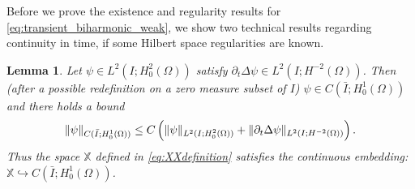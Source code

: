 \documentclass{m2an}
\newcommand{\1}{\mathds{1}}
\newcommand{\Om}{\Omega}
\DeclarePairedDelimiter{\norm}{\lVert}{\rVert}
\newcommand{\XX}{\mathbb{X}}
\newtheorem{lemma}[theorem]{Lemma}
\theoremstyle{definition}
\begin{document}
Before we prove the existence and regularity results for \eqref{eq:transient_biharmonic_weak}, we 
    show two technical results regarding continuity in time, if some Hilbert space regularities are known.
\begin{lemma}\label{lemm:H1_continuity}
    Let $\psi \in L^2(I;H^2_0(\Om))$ satisfy $\partial_t \Delta \psi \in L^2(I;H^{-2}(\Om))$.
    Then (after a possible redefinition on a zero measure subset of $I$)
    $\psi \in C(\bar I;H^1_0(\Om))$ and there holds a bound
    \begin{equation*}
        \norm{\psi}_{C(\bar I;H^1_0(\Om))} 
        \le C \left( \norm{\psi}_{L^2(I;H^2_0(\Om))} 
        + \norm{\partial_t \Delta \psi}_{L^2(I;H^{-2}(\Om))}\right).
    \end{equation*}
    Thus the space $\XX$ defined in \eqref{eq:XXdefinition} satisfies the continuous embedding:
    $\XX \hookrightarrow C(\bar I;H^1_0(\Om))$.
\end{lemma}
\end{document}
